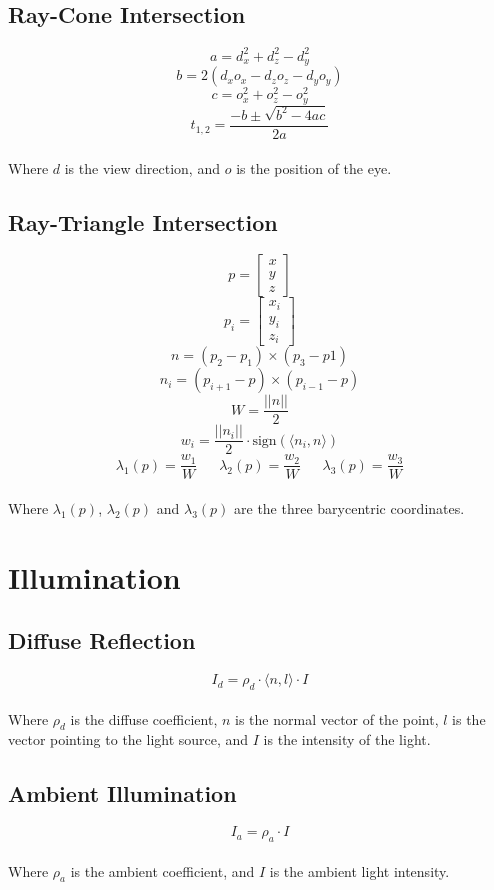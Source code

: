 \documentclass{article}
\begin{document}
\subsection{Ray-Cone Intersection}
\vspace{.3cm}
\[ a = d_x^2 + d_z^2 - d_y^2 \]
\[ b = 2(d_xo_x - d_zo_z - d_yo_y) \]
\[ c = o_x^2 + o_z^2 - o_y^2 \]
\[ t_{1,2} = \frac{-b \pm \sqrt{b^2 - 4ac}}{2a} \] \\
Where $d$ is the view direction, and $o$ is the position of the eye.

\subsection{Ray-Triangle Intersection}
\vspace{.3cm}
\[ p = \begin{bmatrix} x \\ y \\ z \end{bmatrix} \]
\[ p_i = \begin{bmatrix} x_i \\ y_i \\ z_i \end{bmatrix} \]
\[ n = (p_2 - p_1) \times (p_3 - p1) \]
\[ n_i = (p_{i+1} - p) \times (p_{i-1} - p) \]
\[ W = \frac{||n||}{2} \]
\[ w_i = \frac{||n_i||}{2} \cdot \text{sign}(\langle n_i, n \rangle) \]
\[ \lambda_1(p) = \frac{w_1}{W} ~~~~~~~ \lambda_2(p) = \frac{w_2}{W} ~~~~~~~ \lambda_3(p) = \frac{w_3}{W} \] \\
Where $\lambda_1(p)$, $\lambda_2(p)$ and $\lambda_3(p)$ are the three barycentric coordinates.

\section{Illumination}
\subsection{Diffuse Reflection}
\vspace{.3cm}
\[ I_d = \rho_d \cdot \langle n, l \rangle \cdot I \] \\
Where $\rho_d$ is the diffuse coefficient, $n$ is the normal vector of the point, $l$ is the vector pointing to the light source, and $I$ is the intensity of the light.

\subsection{Ambient Illumination}
\vspace{.3cm}
\[ I_a = \rho_a \cdot I \] \\
Where $\rho_a$ is the ambient coefficient, and $I$ is the ambient light intensity.
\end{document}
